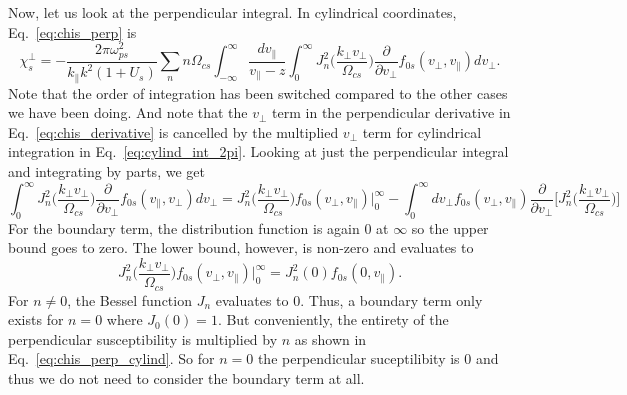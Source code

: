 Now, let us look at the perpendicular integral. In cylindrical coordinates, Eq.~\ref{eq:chis_perp} is
\begin{equation}
	\chi_s^\perp = -\frac{2\pi \omega_{ps}^2}{k_\parallel k^2 (1+U_s)} \sum_n
	n \Omega_{cs} 
	\int_{-\infty}^\infty \frac{dv_\parallel}{v_\parallel - z} 
	\int_0^\infty J_n^2 \bigg( \frac{k_\perp v_\perp}{\Omega_{cs}}  \bigg)
	\frac{\partial }{\partial v_\perp} f_{0s}(v_\perp, v_\parallel) dv_\perp.
	\label{eq:chis_perp_cylind}
\end{equation}
Note that the order of integration has been switched compared to the other cases we have been doing. 
And note that the $v_\perp$ term in the perpendicular derivative in Eq.~\ref{eq:chis_derivative} is cancelled by the multiplied $v_\perp$ term for cylindrical integration in Eq.~\ref{eq:cylind_int_2pi}.
Looking at just the perpendicular integral and integrating by parts, we get
\begin{equation}
	\int_0^\infty J_n^2 \bigg( \frac{k_\perp v_\perp}{\Omega_{cs}}  \bigg)
	\frac{\partial }{\partial v_\perp} f_{0s}(v_\parallel,v_\perp) dv_\perp = 
	J_n^2 \bigg( \frac{k_\perp v_\perp}{\Omega_{cs}}  \bigg) f_{0s}(v_\perp, v_\parallel)\bigg|_0^\infty
	-\int_0^\infty dv_\perp f_{0s}(v_\perp, v_\parallel)
	\frac{\partial}{\partial v_\perp} \Bigg[  
	J_n^2 \bigg( \frac{k_\perp v_\perp}{\Omega_{cs}}  \bigg)
	\Bigg]
	\label{eq:perp_int_parts}
\end{equation}
For the boundary term, the distribution function is again 0 at $\infty$ so the upper bound goes to zero.
The lower bound, however, is non-zero and evaluates to 
\begin{equation}
	J_n^2 \bigg( \frac{k_\perp v_\perp}{\Omega_{cs}}  \bigg) f_{0s}(v_\perp, v_\parallel)\bigg|_0^\infty
	= J_n^2(0) f_{0s}(0, v_\parallel).
	\label{eq:perp_int_boundary}
\end{equation}
For $n\neq0$, the Bessel function $J_n$ evaluates to 0.
Thus, a boundary term only exists for $n=0$ where $J_0(0)=1$.
But conveniently, the entirety of the perpendicular susceptibility is multiplied by $n$ as shown in Eq.~\ref{eq:chis_perp_cylind}.
So for $n=0$ the perpendicular suceptilibity is 0 and thus we do not need to consider the boundary term at all.

